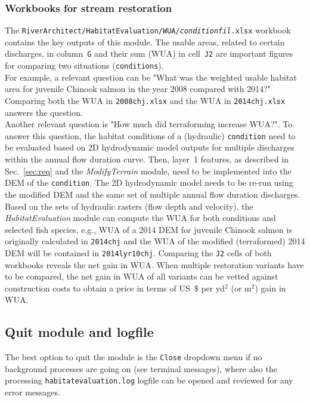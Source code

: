\subsubsection{Workbooks for stream restoration} \label{sec:heoutwork}
The \texttt{RiverArchitect/HabitatEvaluation/WUA/\textit{condition}{\myUnderscore}\textit{fil}.xlsx} workbook contains the key outputs of this module. The usable areas, related to certain discharges, in column~\texttt{G} and their sum (WUA) in cell~\texttt{J2} are important figures for comparing two situations (\texttt{conditions}).\\
For example, a relevant question can be "What was the weighted usable habitat area for juvenile Chinook salmon in the year 2008 compared with 2014?" Comparing both the WUA in \texttt{2008{\myUnderscore}chj.xlsx} and the WUA in \texttt{2014{\myUnderscore}chj.xlsx} answers the question.\\
Another relevant question is "How much did terraforming increase WUA?". To answer this question, the habitat conditions of a (hydraulic) \texttt{condition} need to be evaluated based on 2D hydrodynamic model outputs for multiple discharges within the annual flow duration curve. Then, layer~1 features, as described in Sec.~\ref{sec:req} and the \textit{ModifyTerrain} module, need to be implemented into the DEM of the \texttt{condition}. The 2D hydrodynamic model needs to be re-run using the modified DEM and the same set of multiple annual flow duration discharges. Based on the sets of hydraulic rasters (flow depth and velocity), the \textit{HabitatEvaluation} module can compute the WUA for both conditions and selected fish species, e.g., WUA of a 2014 DEM for juvenile Chinook salmon is originally calculated in \texttt{2014{\myUnderscore}chj} and the WUA of the modified (terraformed) 2014 DEM will be contained in \texttt{2014{\myUnderscore}lyr10{\myUnderscore}chj}. Comparing the \texttt{J2} cells of both workbooks reveals the net gain in WUA. When multiple restoration variants have to be compared, the net gain in WUA of all variants can be vetted against construction costs to obtain a price in terms of US~$\$$ per yd$^2$ (or m$^2$) gain in WUA.

\subsection{Quit module and logfile}
The best option to quit the module is the \texttt{Close} dropdown menu if no background processes are going on (see terminal messages), where also the processing \texttt{habitat{\myUnderscore}evaluation.log} logfile can be opened and reviewed for any error messages. 

